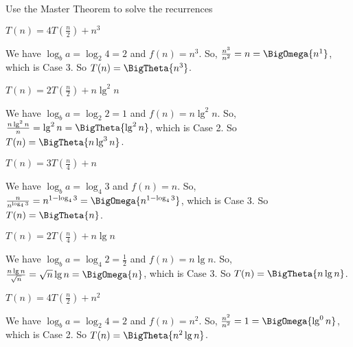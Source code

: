 \documentclass[12pt,letterpaper]{hmcpset}
\newcommand{\recur}[3]{T(n)=#1T(\frac{n}{#2})+#3}
\begin{document}
\problemlist{}

\begin{problem}[1]
Use the Master Theorem to solve the recurrences
\end{problem}

\begin{problem}[1a]
$\recur{4}{2}{n^3}$
\end{problem}

\begin{solution}
We have $\log_b a = \log_2 4 = 2$ and $f(n) = n^3$.  So, $\frac{n^3}{n^2} = n = \BigOmega{n^1}$, which is Case 3.  So $T(n) = \BigTheta{n^3}$.
\end{solution}

\begin{problem}[1b]
$\recur{2}{2}{n\lg^2 n}$
\end{problem}

\begin{solution}
We have $\log_b a = \log_2 2 = 1$ and $f(n) = n\lg^2 n$.  So, $\frac{n\lg^2 n}{n} = \lg^2 n = \BigTheta{\lg^2 n}$, which is Case 2.  So $T(n) = \BigTheta{n\lg^3 n}$.
\end{solution}

\begin{problem}[1c]
$\recur{3}{4}{n}$
\end{problem}

\begin{solution}
We have $\log_b a = \log_4 3$ and $f(n) = n$.  So, $\frac{n}{n^{\log_4 3}} = n^{1-\log_4 3} = \BigOmega{n^{1-\log_4 3}}$, which is Case 3.  So $T(n) = \BigTheta{n}$.
\end{solution}

\begin{problem}[1d]
$\recur{2}{4}{n\lg n}$
\end{problem}

\begin{solution}
We have $\log_b a = \log_4 2 = \frac{1}{2}$ and $f(n) = n\lg n$.  So, $\frac{n\lg n}{\sqrt{n}} = \sqrt{n} \lg n = \BigOmega{n}$, which is Case 3.  So $T(n) = \BigTheta{n\lg n}$.
\end{solution}

\begin{problem}[1e]
$\recur{4}{2}{n^2}$
\end{problem}

\begin{solution}
We have $\log_b a = \log_2 4 = 2$ and $f(n) = n^2$.  So, $\frac{n^2}{n^2} = 1 = \BigOmega{\lg^0 n}$, which is Case 2.  So $T(n) = \BigTheta{n^2 \lg n}$.
\end{solution}
\end{document}
